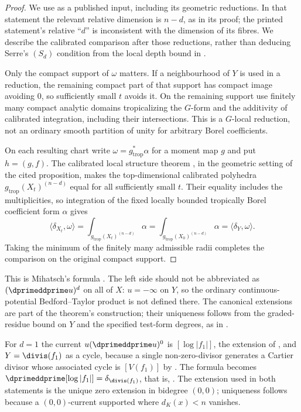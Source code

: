 \begin{proof}
We use \cite[Proposition~18.7.3]{CLD25} as a published input, including
its geometric reductions.  In that statement the relevant relative
dimension is $n-d$, as in its proof; the printed statement's relative
``$d$'' is inconsistent with the dimension of its fibres.  We describe the
calibrated comparison after those reductions, rather than deducing
Serre's $(S_d)$ condition from the local depth bound in
.

Only the compact support of $\omega$ matters.  If a neighbourhood of $Y$
is used in a reduction, the remaining compact part of that support has
compact image avoiding $0$, so sufficiently small $t$ avoids it.  On the
remaining support use finitely many compact analytic domains
tropicalizing the $G$-form and the additivity of calibrated integration,
including their intersections.  This is a $G$-local reduction, not an
ordinary smooth partition of unity for arbitrary Borel coefficients.

On each resulting chart write $\omega=g_{\mathrm{trop}}^*\alpha$ for a
moment map $g$ and put $h=(g,f)$.  The calibrated local structure theorem
\cite[Theorem~14.7.2(a)]{CLD25}, in the geometric setting of the cited
proposition, makes the top-dimensional calibrated polyhedra
$g_{\mathrm{trop}}(X_t)^{(n-d)}$ equal for all sufficiently small $t$.
Their equality includes the multiplicities, so integration of the fixed
locally bounded tropically Borel coefficient form $\alpha$ gives
\[
 \langle\delta_{X_t},\omega\rangle
 =\int_{g_{\mathrm{trop}}(X_t)^{(n-d)}}\alpha
 =\int_{g_{\mathrm{trop}}(X_0)^{(n-d)}}\alpha
 =\langle\delta_Y,\omega\rangle.
\]
Taking the minimum of the finitely many admissible radii completes the
comparison on the original compact support.
\end{proof}

This is Mihatsch's formula
\cite[Theorem~18.7.2]{CLD25}.  The left side should not be abbreviated as
$(\dprimeddprime u)^d$ on all of $X$: $u=-\infty$ on $Y$, so the ordinary
continuous-potential Bedford--Taylor product is not defined there.  The
canonical extensions are part of the theorem's construction; their
uniqueness follows from the graded-residue bound on $Y$ and the specified
test-form degrees, as in .

\begin{example}[$d=1$ recovers Poincar\'e--Lelong]
\label{ex:ch15-bm-d1}
For $d=1$ the current $u(\dprimeddprime u)^0$ is $[\log|f_1|]$, the extension
of , and $Y=\divis(f_1)$ as a cycle, because a
single non-zero-divisor generates a Cartier divisor whose associated cycle is
$[V(f_1)]$ by .  The formula becomes
$\dprimeddprime[\log|f_1|]=\delta_{\divis(f_1)}$, that is,
.  The extension used in both statements is the
unique zero extension in bidegree $(0,0)$; uniqueness follows because a
$(0,0)$-current supported where $d_K(x)<n$ vanishes.
\end{example}

